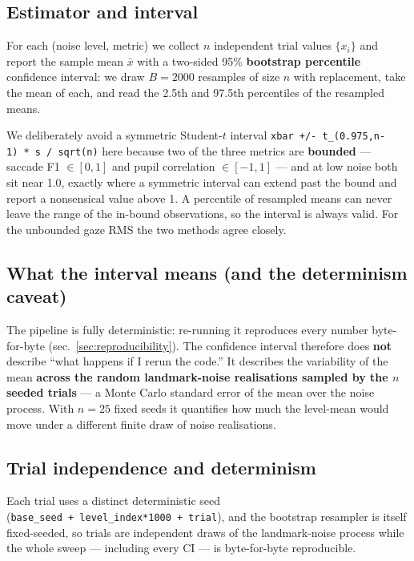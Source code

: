 \documentclass[
]{article}
\begin{document}
\subsection{Estimator and interval}\label{estimator-and-interval}

For each (noise level, metric) we collect \(n\) independent trial values
\(\{x_i\}\) and report the sample mean \(\bar{x}\) with a two-sided 95\%
\textbf{bootstrap percentile} confidence interval: we draw \(B = 2000\)
resamples of size \(n\) with replacement, take the mean of each, and
read the 2.5th and 97.5th percentiles of the resampled means.

We deliberately avoid a symmetric Student-\(t\) interval
\texttt{xbar\ +/-\ t\_(0.975,n-1)\ *\ s\ /\ sqrt(n)} here because two of
the three metrics are \textbf{bounded} --- saccade F1 \(\in [0,1]\) and
pupil correlation \(\in [-1,1]\) --- and at low noise both sit near 1.0,
exactly where a symmetric interval can extend past the bound and report
a nonsensical value above 1. A percentile of resampled means can never
leave the range of the in-bound observations, so the interval is always
valid. For the unbounded gaze RMS the two methods agree closely.

\subsection{What the interval means (and the determinism
caveat)}\label{what-the-interval-means-and-the-determinism-caveat}

The pipeline is fully deterministic: re-running it reproduces every
number byte-for-byte (sec.~\ref{sec:reproducibility}). The confidence
interval therefore does \textbf{not} describe ``what happens if I rerun
the code.'' It describes the variability of the mean \textbf{across the
random landmark-noise realisations sampled by the \(n\) seeded trials}
--- a Monte Carlo standard error of the mean over the noise process.
With \(n=25\) fixed seeds it quantifies how much the level-mean would
move under a different finite draw of noise realisations.

\subsection{Trial independence and
determinism}\label{trial-independence-and-determinism}

Each trial uses a distinct deterministic seed
(\texttt{base\_seed\ +\ level\_index*1000\ +\ trial}), and the bootstrap
resampler is itself fixed-seeded, so trials are independent draws of the
landmark-noise process while the whole sweep --- including every CI ---
is byte-for-byte reproducible.
\end{document}
